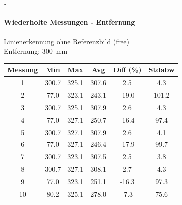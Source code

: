\documentclass[xcolor=dvipsnames]{beamer}
\def\frametitlesec{\frametitle{\arabic{section}.\hspace{0.5ex}\insertsection}}
\def\framesubtitles#1{\framesubtitle{\hspace{3.5ex}#1}}
\begin{document}
\begin{frame}
	\frametitlesec
	\framesubtitles{Wiederholte Messungen - Entfernung}

	Linienerkennung ohne Referenzbild (free)\\
	Entfernung: 300~mm
	\vfill

	\begin{tabular}{c|c|c|c|c|c}
		Messung & Min & Max & Avg & Diff (\%) & Stdabw \\ \hline
		1 & 300.7 & 325.1 & 307.6 & 2.5 & 4.3\\
		2 & 77.0 & 323.1 & 243.1 & -19.0 & 101.2\\
		3 & 300.7 & 325.1 & 307.9 & 2.6 & 4.3\\
		4 & 77.0 & 327.1 & 250.7 & -16.4 & 97.4\\
		5 & 300.7 & 327.1 & 307.9 & 2.6 & 4.1\\
		6 & 77.0 & 327.1 & 246.4 & -17.9 & 99.7\\
		7 & 300.7 & 323.1 & 307.5 & 2.5 & 3.8\\
		8 & 300.7 & 327.1 & 308.1 & 2.7 & 4.3\\
		9 & 77.0 & 323.1 & 251.1 & -16.3 & 97.3\\
		10 & 80.2 & 325.1 & 278.0 & -7.3 & 75.6
	\end{tabular}

\end{frame}
\end{document}
